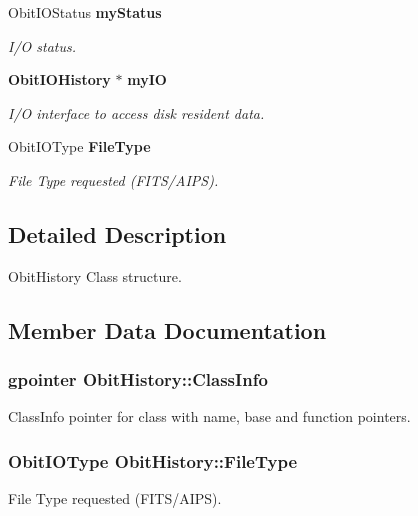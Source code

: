 \begin{CompactItemize}
Obit\-IOStatus {\bf my\-Status}
\begin{CompactList}\small\item\em I/O status. \item\end{CompactList}\item 
{\bf Obit\-IOHistory} $\ast$ {\bf my\-IO}
\begin{CompactList}\small\item\em I/O interface to access disk resident data. \item\end{CompactList}\item 
Obit\-IOType {\bf File\-Type}
\begin{CompactList}\small\item\em File Type requested (FITS/AIPS). \item\end{CompactList}\end{CompactItemize}


\subsection{Detailed Description}
Obit\-History Class structure. 



\subsection{Member Data Documentation}
\subsubsection{\setlength{\rightskip}{0pt plus 5cm}gpointer {\bf Obit\-History::Class\-Info}}\label{structObitHistory_o1}


Class\-Info pointer for class with name, base and function pointers. 

\subsubsection{\setlength{\rightskip}{0pt plus 5cm}Obit\-IOType {\bf Obit\-History::File\-Type}}\label{structObitHistory_o8}


File Type requested (FITS/AIPS). 

